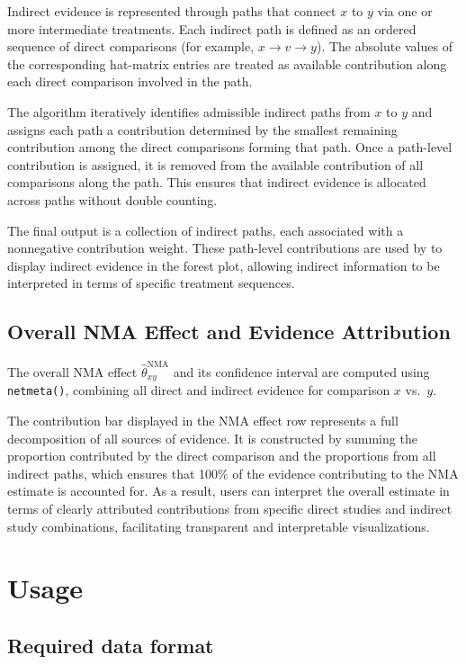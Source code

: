 Indirect evidence is represented through paths that connect $x$ to $y$ via one or more intermediate treatments. Each indirect path is defined as an ordered sequence of direct comparisons (for example, $x \rightarrow v \rightarrow y$). The absolute values of the corresponding hat-matrix entries are treated as available contribution along each direct comparison involved in the path.

The algorithm iteratively identifies admissible indirect paths from $x$ to $y$ and assigns each path a contribution determined by the smallest remaining contribution among the direct comparisons forming that path. Once a path-level contribution is assigned, it is removed from the available contribution of all comparisons along the path. This ensures that indirect evidence is allocated across paths without double counting.

The final output is a collection of indirect paths, each associated with a nonnegative contribution weight. These path-level contributions are used by  to display indirect evidence in the forest plot, allowing indirect information to be interpreted in terms of specific treatment sequences.

\subsection{Overall NMA Effect and Evidence Attribution}

The overall NMA effect $\hat{\theta}^{\mathrm{NMA}}_{xy}$ and its confidence interval are computed using \texttt{netmeta()}, combining all direct and indirect evidence for comparison $x$ vs.\ $y$.

The contribution bar displayed in the NMA effect row represents a full decomposition of all sources of evidence. It is constructed by summing the proportion contributed by the direct comparison and the proportions from all indirect paths, which ensures that 100\% of the evidence contributing to the NMA estimate is accounted for. As a result, users can interpret the overall estimate in terms of clearly attributed contributions from specific direct studies and indirect study combinations, facilitating transparent and interpretable visualizations.

\section{Usage}

\subsection{Required data format}

